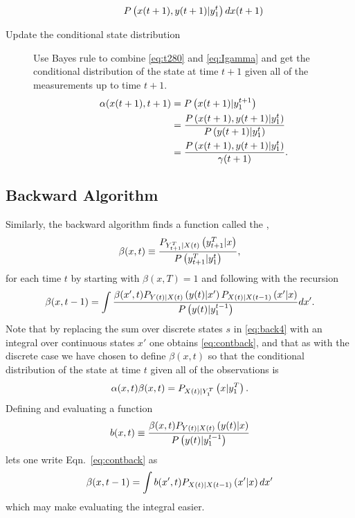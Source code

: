 \begin{description}
\begin{equation}
  P\left({x}{(t+1)},{y}{(t+1)}|y_{1}^{t} \right) d{x}{(t+1)} \\
\end{equation}
\item[Update the conditional state distribution]  Use
  Bayes rule to combine \eqref{eq:t280} and \eqref{eq:Igamma} and get
  the conditional distribution of the state at time $t+1$ given all of
  the measurements up to time $t+1$.
\begin{align}
  \alpha(x(t+1),t+1) &= P\left({x}{(t+1)}|y_{1}^{t+1} \right) \\
  &=  \frac{ P\left({x}{(t+1)},{y}{(t+1)}|y_{1}^{t}
    \right)}{P\left({y}{(t+1)}|y_{1}^{t} \right)}\\
  \label{eq:IUpdate}
  &= \frac{ P\left({x}{(t+1)},{y}{(t+1)}|y_{1}^{t}
    \right)}{{\gamma}{(t+1)}}.
\end{align}
\end{description}

\subsection{Backward Algorithm}

Similarly, the backward algorithm finds a function called the
,
\begin{equation}
  \label{eq:contbeta}
  \beta(x,t) \equiv \frac{P_{Y_{t+1}^{T}|{X}{(t)}}
  \left(y_{t+1}^{T}|x \right)}{P\left(y_{t+1}^{T}|y_{1}^{t}
               \right)},
\end{equation}
for each time $t$ by starting with $\beta(x,T) = 1$ and following with
the recursion
\begin{equation}
  \label{eq:contback}
  \beta(x,t-1) = \int 
  \frac{\beta(x',t) P_{{Y}{(t)}|{X}{(t)}}\left({y}{(t)}|x' \right)
  P_{{X}{(t)}|{X}{(t-1)}}\left(x'|x \right)}
  {P\left({y}{(t)}|y_{1}^{t-1} \right)} dx'.
\end{equation}
Note that by replacing the sum over discrete states $s$ in
\eqref{eq:back4} with an integral over continuous states $x'$ one
obtains \eqref{eq:contback}, and that as with the discrete case we
have chosen to define $\beta(x,t)$ so that the conditional
distribution of the state at time $t$ given all of the observations is
\begin{equation}
  \label{eq:contalphabeta}
  \alpha(x,t) \beta(x,t) = P_{{X}{(t)}|Y_{1}^{T}}
  \left(x|y_{1}^{T} \right).
\end{equation}
Defining and evaluating a \emph{} function
\begin{equation}
  \label{eq:bdef}
  b(x,t) \equiv \frac{\beta(x,t)
    P_{{Y}{(t)}|{X}{(t)}}\left({y}{(t)}|x
    \right)} {P\left({y}{(t)}|y_{1}^{t-1} \right)}
\end{equation}
lets one write Eqn.~\eqref{eq:contback} as
\begin{equation*}
  \beta(x,t-1) = \int b(x',t) P_{{X}{(t)}|{X}{(t-1)}}\left(x'|x
  \right) dx'
\end{equation*}
which may make evaluating the integral easier.

